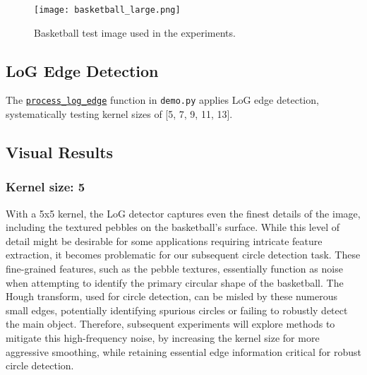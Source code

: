 \documentclass[12pt,a4paper]{article}
\begin{document}
\begin{figure}[H]
    \centering
    \texttt{[image: basketball\_large.png]}
    \caption{Basketball test image used in the experiments.}
    \label{fig:test_image}
\end{figure}




\subsection{LoG Edge Detection}
The \href{Code/demo.py}{\texttt{process\_log\_edge}} function in \texttt{demo.py} applies LoG edge detection, systematically testing kernel sizes of [5, 7, 9, 11, 13].



\subsection*{Visual Results}

\subsubsection*{Kernel size: 5}

With a 5x5 kernel, the LoG detector captures even the finest details of the image, including the textured pebbles on the basketball's surface. While this level of detail might be desirable for some applications requiring intricate feature extraction, it becomes problematic for our subsequent circle detection task. These fine-grained features, such as the pebble textures, essentially function as noise when attempting to identify the primary circular shape of the basketball. The Hough transform, used for circle detection, can be misled by these numerous small edges, potentially identifying spurious circles or failing to robustly detect the main object. Therefore, subsequent experiments will explore methods to mitigate this high-frequency noise, by increasing the kernel size for more aggressive smoothing, while retaining essential edge information critical for robust circle detection.
\end{document}
